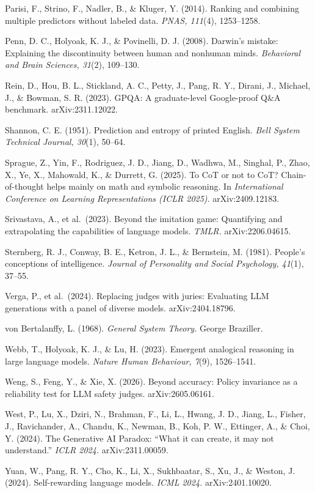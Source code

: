 \documentclass{article}
\begin{document}
Parisi, F., Strino, F., Nadler, B., \& Kluger, Y. (2014). Ranking and combining multiple predictors without labeled data. \emph{PNAS, 111}(4), 1253--1258.

Penn, D. C., Holyoak, K. J., \& Povinelli, D. J. (2008). Darwin's mistake: Explaining the discontinuity between human and nonhuman minds. \emph{Behavioral and Brain Sciences, 31}(2), 109--130.

Rein, D., Hou, B. L., Stickland, A. C., Petty, J., Pang, R. Y., Dirani, J., Michael, J., \& Bowman, S. R. (2023). GPQA: A graduate-level Google-proof Q\&A benchmark. arXiv:2311.12022.

Shannon, C. E. (1951). Prediction and entropy of printed English. \emph{Bell System Technical Journal, 30}(1), 50--64.

Sprague, Z., Yin, F., Rodriguez, J. D., Jiang, D., Wadhwa, M., Singhal, P., Zhao, X., Ye, X., Mahowald, K., \& Durrett, G. (2025). To CoT or not to CoT? Chain-of-thought helps mainly on math and symbolic reasoning. In \emph{International Conference on Learning Representations (ICLR 2025)}. arXiv:2409.12183.

Srivastava, A., et al.~(2023). Beyond the imitation game: Quantifying and extrapolating the capabilities of language models. \emph{TMLR.} arXiv:2206.04615.

Sternberg, R. J., Conway, B. E., Ketron, J. L., \& Bernstein, M. (1981). People's conceptions of intelligence. \emph{Journal of Personality and Social Psychology, 41}(1), 37--55.

Verga, P., et al.~(2024). Replacing judges with juries: Evaluating LLM generations with a panel of diverse models. arXiv:2404.18796.

von Bertalanffy, L. (1968). \emph{General System Theory.} George Braziller.

Webb, T., Holyoak, K. J., \& Lu, H. (2023). Emergent analogical reasoning in large language models. \emph{Nature Human Behaviour, 7}(9), 1526--1541.

Weng, S., Feng, Y., \& Xie, X. (2026). Beyond accuracy: Policy invariance as a reliability test for LLM safety judges. arXiv:2605.06161.

West, P., Lu, X., Dziri, N., Brahman, F., Li, L., Hwang, J. D., Jiang, L., Fisher, J., Ravichander, A., Chandu, K., Newman, B., Koh, P. W., Ettinger, A., \& Choi, Y. (2024). The Generative AI Paradox: ``What it can create, it may not understand.'' \emph{ICLR 2024.} arXiv:2311.00059.

Yuan, W., Pang, R. Y., Cho, K., Li, X., Sukhbaatar, S., Xu, J., \& Weston, J. (2024). Self-rewarding language models. \emph{ICML 2024.} arXiv:2401.10020.
\end{document}
